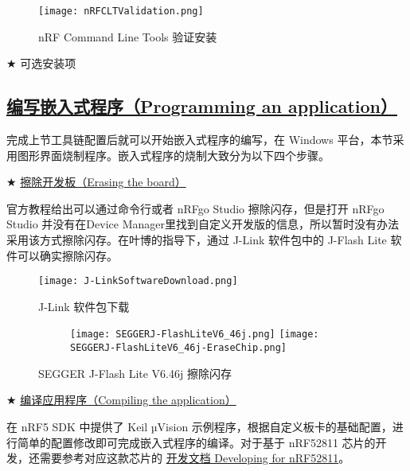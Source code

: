 \documentclass{WHUResearch}  %
\begin{document}
\begin{figure}[htbp]
\centering
  \texttt{[image: nRFCLTValidation.png]}
  \caption{nRF Command Line Tools 验证安装}
  \label{fig:nRFCLTValidation}
\end{figure}

$\bigstar$ 可选安装项

\subsection{\href{https://infocenter.nordicsemi.com/index.jsp?topic=\%2Fug_gsg_keil\%2FUG\%2Fgsg\%2Finstall_nrf5_sdk.html}{编写嵌入式程序（Programming an application）}}

完成上节工具链配置后就可以开始嵌入式程序的编写，在 Windows 平台，本节采用图形界面烧制程序。嵌入式程序的烧制大致分为以下四个步骤。

$\bigstar$ \href{https://infocenter.nordicsemi.com/index.jsp?topic=\%2Fug_gsg_keil\%2FUG\%2Fgsg\%2Ferase_board.html}{擦除开发板（Erasing the board）}

官方教程给出可以通过命令行或者 nRFgo Studio 擦除闪存，但是打开 nRFgo Studio 并没有在Device Manager里找到自定义开发版的信息，所以暂时没有办法采用该方式擦除闪存。在叶博的指导下，通过 J-Link 软件包中的 J-Flash Lite 软件可以确实擦除闪存。
\begin{figure}[htbp]
\centering
  \texttt{[image: J-LinkSoftwareDownload.png]}
  \caption{J-Link 软件包下载}
  \label{fig:J-LinkSoftwareDownload}
\end{figure}

\begin{figure}[htbp]
	\centering
	\begin{subfigure}[htbp]{1.0\textwidth}
	\centering
		\texttt{[image: SEGGERJ-FlashLiteV6\_46j.png]}
		\label{fig:SEGGERJ-FlashLiteV6.46j}
		\texttt{[image: SEGGERJ-FlashLiteV6\_46j-EraseChip.png]}
		\label{fig:SEGGERJ-FlashLiteV6.46j-EraseChip}
	\end{subfigure}
	\caption{SEGGER J-Flash Lite V6.46j 擦除闪存}
	\label{fig:SEGGERJ-FlashLite}
\end{figure}

$\bigstar$ \href{https://infocenter.nordicsemi.com/index.jsp?topic=\%2Fug_gsg_keil\%2FUG\%2Fgsg\%2Fcompile_keil.html}{编译应用程序（Compiling the application）}

在 nRF5 SDK 中提供了 Keil µVision 示例程序，根据自定义板卡的基础配置，进行简单的配置修改即可完成嵌入式程序的编译。对于基于 nRF52811 芯片的开发，还需要参考对应这款芯片的 \href{https://infocenter.nordicsemi.com/index.jsp?topic=\%2Fstruct_nrf52\%2Fstruct\%2Fnrf52811.html&cp=3_2}{开发文档 Developing for nRF52811}。
\end{document}
